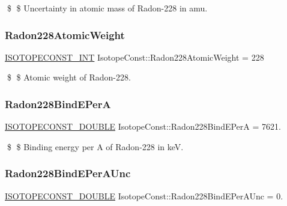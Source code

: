 \$ \$ Uncertainty in atomic mass of Radon-\/228 in amu. \mbox{\label{group___isotope_const-_radon-_rn228_ga4478881327019aea184821d22f98e43a}} 
\subsubsection{\texorpdfstring{Radon228\+Atomic\+Weight}{Radon228AtomicWeight}}
{\footnotesize\ttfamily \mbox{\hyperlink{group___isotope_const-_macros_ga5f18360b3e99483a35c32d789e62621c}{I\+S\+O\+T\+O\+P\+E\+C\+O\+N\+S\+T\+\_\+\+I\+NT}} Isotope\+Const\+::\+Radon228\+Atomic\+Weight = 228}

\$ \$ Atomic weight of Radon-\/228. \mbox{\label{group___isotope_const-_radon-_rn228_gac271faa8e78ed71718ecd85b44549b1a}} 
\subsubsection{\texorpdfstring{Radon228\+Bind\+E\+PerA}{Radon228BindEPerA}}
{\footnotesize\ttfamily \mbox{\hyperlink{group___isotope_const-_macros_ga8f45a7272ce02c0b4c65c44636ed719a}{I\+S\+O\+T\+O\+P\+E\+C\+O\+N\+S\+T\+\_\+\+D\+O\+U\+B\+LE}} Isotope\+Const\+::\+Radon228\+Bind\+E\+PerA = 7621.}

\$ \$ Binding energy per A of Radon-\/228 in keV. \mbox{\label{group___isotope_const-_radon-_rn228_gaffaa059684606b7cb1d4bfb78bbe79ed}} 
\subsubsection{\texorpdfstring{Radon228\+Bind\+E\+Per\+A\+Unc}{Radon228BindEPerAUnc}}
{\footnotesize\ttfamily \mbox{\hyperlink{group___isotope_const-_macros_ga8f45a7272ce02c0b4c65c44636ed719a}{I\+S\+O\+T\+O\+P\+E\+C\+O\+N\+S\+T\+\_\+\+D\+O\+U\+B\+LE}} Isotope\+Const\+::\+Radon228\+Bind\+E\+Per\+A\+Unc = 0.}

